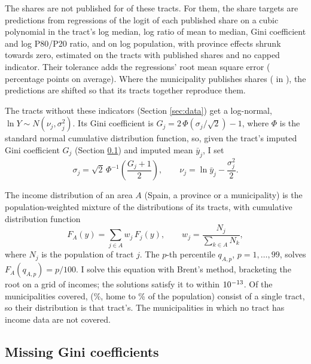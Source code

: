 The shares are not published for \GbPriorTracts{} of these tracts. For them, the share targets are predictions from regressions of the logit of each published share on a cubic polynomial in the tract's log median, log ratio of mean to median, Gini coefficient and log P80/P20 ratio, and on log population, with province effects shrunk towards zero, estimated on the \GbPriorTrain{} tracts with published shares and no capped indicator. Their tolerance adds the regressions' root mean square error (\GbPriorRMSE{} percentage points on average). Where the municipality publishes shares (\GbGapMuns{} in \BaseYear{}), the predictions are shifted so that its tracts together reproduce them.

The \LocMeanTracts{} tracts without these indicators (Section \ref{sec:data}) get a log-normal, $\ln Y \sim N(\nu_j, \sigma_j^2)$. Its Gini coefficient is $G_j = 2\,\Phi(\sigma_j/\sqrt{2}) - 1$, where $\Phi$ is the standard normal cumulative distribution function, so, given the tract's imputed Gini coefficient $G_j$ (Section \ref{sec:gini}) and imputed mean $\bar y_j$, I set
\begin{equation}\label{eq:params}
\sigma_j = \sqrt{2}\,\Phi^{-1}\!\left(\frac{G_j + 1}{2}\right), \qquad \nu_j = \ln \bar y_j - \frac{\sigma_j^2}{2}.
\end{equation}

The income distribution of an area $A$ (Spain, a province or a municipality) is the population-weighted mixture of the distributions of its tracts, with cumulative distribution function
\begin{equation}\label{eq:mixture}
F_A(y) = \sum_{j \in A} w_j\, F_j(y), \qquad w_j = \frac{N_j}{\sum_{k \in A} N_k},
\end{equation}
where $N_j$ is the population of tract $j$. The $p$-th percentile $q_{A,p}$, $p = 1, \dots, 99$, solves $F_A(q_{A,p}) = p/100$. I solve this equation with Brent's method, bracketing the root on a grid of incomes; the solutions satisfy it to within $10^{-13}$. Of the \MunLookup{} municipalities covered, \MunSingleTract{} (\MunSingleTractPct{}\%, home to \MunSingleTractPopPct{}\% of the population) consist of a single tract, so their distribution is that tract's. The \MunDropped{} municipalities in which no tract has income data are not covered.

\subsection{Missing Gini coefficients}\label{sec:gini}

